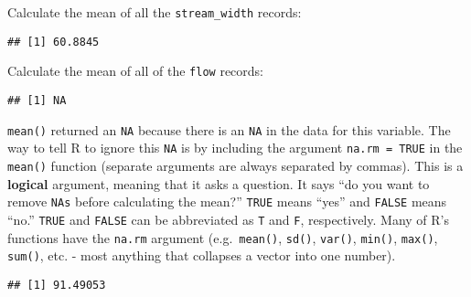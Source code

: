 \documentclass[]{book}
\newenvironment{Shaded}{\begin{snugshade}}{\end{snugshade}}
\newcommand{\DataTypeTok}[1]{\textcolor[rgb]{0.13,0.29,0.53}{#1}}
\newcommand{\KeywordTok}[1]{\textcolor[rgb]{0.13,0.29,0.53}{\textbf{#1}}}
\newcommand{\NormalTok}[1]{#1}
\newcommand{\OperatorTok}[1]{\textcolor[rgb]{0.81,0.36,0.00}{\textbf{#1}}}
\begin{document}
Calculate the mean of all the \texttt{stream\_width} records:

\begin{Shaded}
\end{Shaded}

\begin{verbatim}
## [1] 60.8845
\end{verbatim}

Calculate the mean of all of the \texttt{flow} records:

\begin{Shaded}
\end{Shaded}

\begin{verbatim}
## [1] NA
\end{verbatim}

\texttt{mean()} returned an \texttt{NA} because there is an \texttt{NA} in the data for this variable. The way to tell R to ignore this \texttt{NA} is by including the argument \texttt{na.rm\ =\ TRUE} in the \texttt{mean()} function (separate arguments are always separated by commas). This is a \textbf{logical} argument, meaning that it asks a question. It says ``do you want to remove \texttt{NAs} before calculating the mean?'' \texttt{TRUE} means ``yes'' and \texttt{FALSE} means ``no.'' \texttt{TRUE} and \texttt{FALSE} can be abbreviated as \texttt{T} and \texttt{F}, respectively. Many of R's functions have the \texttt{na.rm} argument (e.g.~\texttt{mean()}, \texttt{sd()}, \texttt{var()}, \texttt{min()}, \texttt{max()}, \texttt{sum()}, etc. - most anything that collapses a vector into one number).

\begin{Shaded}
\end{Shaded}

\begin{verbatim}
## [1] 91.49053
\end{verbatim}
\end{document}
